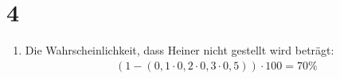 \documentclass[ngerman]{scrartcl}
\begin{document}
\section*{4}
  \begin{enumerate}[label=\alph*)]
    \addtocounter{enumi}{2}
    \item
    Die Wahrscheinlichkeit, dass Heiner nicht gestellt wird beträgt: \\
    \begin{align*}
    (1 - (0,1 \cdot 0,2 \cdot 0,3 \cdot 0,5)) \cdot 100 = 70\%
    \end{align*}
  \end{enumerate}
\end{document}
